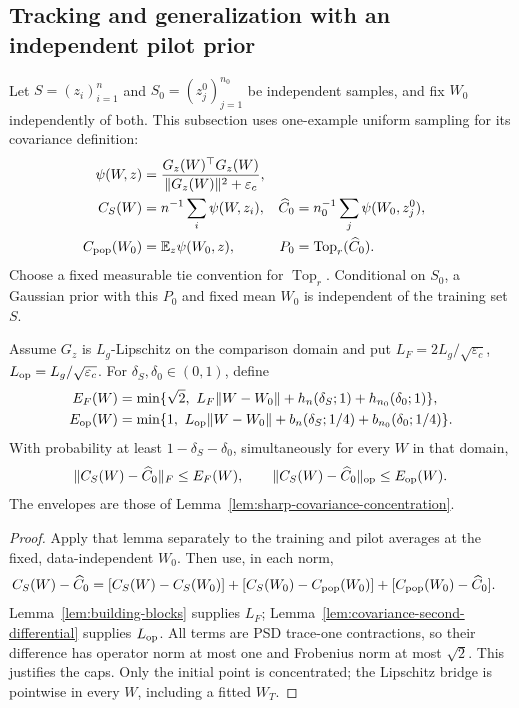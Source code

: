 \subsection{Tracking and generalization with an independent pilot prior}
\label{app:pilot-prior}
Let $S=(z_i)_{i=1}^n$ and $S_0=(z_j^0)_{j=1}^{n_0}$ be independent
samples, and fix $W_0$ independently of both. This subsection uses
one-example uniform sampling for its covariance definition:
\begin{align}
 \psi(W,z)&=\frac{G_z(W)^\top G_z(W)}{\|G_z(W)\|^2+\varepsilon_c},\\
 C_S(W)&=n^{-1}\sum_i\psi(W,z_i),&
 \widehat C_0&=n_0^{-1}\sum_j\psi(W_0,z_j^0),\\
 C_{\rm pop}(W_0)&=\mathbb E_z\psi(W_0,z),&
 P_0&=\operatorname{Top}_r(\widehat C_0).
\end{align}
Choose a fixed measurable tie convention for $\operatorname{Top}_r$.
Conditional on $S_0$, a Gaussian prior with this $P_0$ and fixed mean $W_0$
is independent of the training set $S$.

\begin{lemma}
\label{lem:pilot-concentration}
Assume $G_z$ is $L_g$-Lipschitz on the comparison domain and put
$L_F=2L_g/\sqrt{\varepsilon_c}$, $L_{\rm op}=L_g/\sqrt{\varepsilon_c}$.
For $\delta_S,\delta_0\in(0,1)$, define
\begin{align}
 E_F(W)&=\min\{\sqrt2,\ L_F\|W-W_0\|
       +h_n(\delta_S;1)+h_{n_0}(\delta_0;1)\},\\
 E_{\rm op}(W)&=\min\{1,\ L_{\rm op}\|W-W_0\|
       +b_n(\delta_S;1/4)+b_{n_0}(\delta_0;1/4)\}.
\end{align}
With probability at least $1-\delta_S-\delta_0$, simultaneously for every
$W$ in that domain,
\begin{equation}
 \|C_S(W)-\widehat C_0\|_F\le E_F(W),\qquad
 \|C_S(W)-\widehat C_0\|_{\rm op}\le E_{\rm op}(W).
 \label{eq:pilot-covariance-bridge}
\end{equation}
The envelopes are those of Lemma~\ref{lem:sharp-covariance-concentration}.
\end{lemma}
\begin{proof}
Apply that lemma separately to the training and pilot averages at the
fixed, data-independent $W_0$. Then use, in each norm,
\begin{align}
 C_S(W)-\widehat C_0
 &=[C_S(W)-C_S(W_0)]
   +[C_S(W_0)-C_{\rm pop}(W_0)]
   +[C_{\rm pop}(W_0)-\widehat C_0].
\end{align}
Lemma~\ref{lem:building-blocks} supplies $L_F$;
Lemma~\ref{lem:covariance-second-differential} supplies $L_{\rm op}$.
All terms are PSD trace-one contractions, so their difference has operator
norm at most one and Frobenius norm at most $\sqrt2$. This justifies the
caps. Only the initial point is concentrated; the Lipschitz bridge is
pointwise in every $W$, including a fitted $W_T$.
\end{proof}

